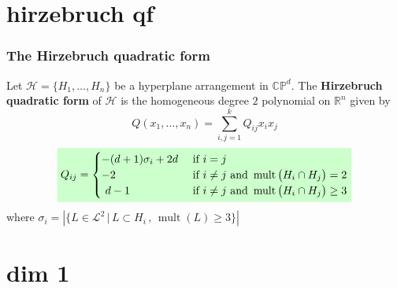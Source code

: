 \documentclass{beamer}
\newcommand{\R}{\mathbb{R}}
\newcommand{\CP}{\mathbb{CP}}
\newcommand{\mL}{\mathcal{L}}
\newcommand{\mH}{\mathcal{H}}
\DeclareMathOperator{\mul}{mult}
\newcommand{\mathcolorbox}[2]{\colorbox{#1}{$\displaystyle #2$}}
\begin{document}
\section{hirzebruch qf}
\begin{frame}
	\frametitle{The Hirzebruch quadratic form}
	Let \(\mH = \{H_1, \ldots, H_n\}\) be a hyperplane arrangement in \(\CP^d\).
	The \textbf{Hirzebruch quadratic form} of \(\mH\) is the homogeneous degree \(2\) polynomial on \(\R^n\) given by
		\[
	Q(x_1, \ldots, x_n) = \sum_{i,j = 1}^k Q_{ij} x_i x_j 
	\]
	\[
	\mathcolorbox{green!20}{
		Q_{ij} = \begin{cases}
			- (d+1) \sigma_i + 2d &\text{ if } i = j  \\
			-2 &\text{ if }  i \neq j \text{ and } \mul \big(H_i \cap H_j\big) = 2  \\
			\,\, d-1 &\text{ if } i \neq j \text{ and } \mul \big(H_i \cap H_j\big) \geq 3 
		\end{cases}
	}
	\]
	where \(\sigma_i = \left| \{L \in \mL^2 \,|\, L\subset H_i \,,\, \mul(L) \geq 3 \}\right|\) 
\end{frame}


\section{dim 1}
\end{document}
